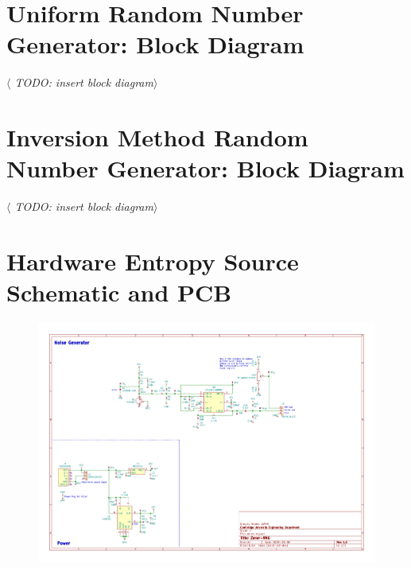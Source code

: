 \documentclass[12pt]{article}
\begin{document}
\begin{appendix}
  \section{Uniform Random Number Generator: Block Diagram}
    \textit{$\langle$ TODO: insert block diagram$\rangle$}



  \section{Inversion Method Random Number Generator: Block Diagram}
    \textit{$\langle$ TODO: insert block diagram$\rangle$}


  \newpage
  \section{Hardware Entropy Source Schematic and PCB} \label{appendix:schematic}
  \vspace{-1cm}
    \begin{figure}[H]
      \centering
      \includegraphics[angle=90,width=\textwidth]{fig/schematic.pdf}
      \label{fig:schematic}
    \end{figure}

    \newpage


\end{appendix}
\end{document}
